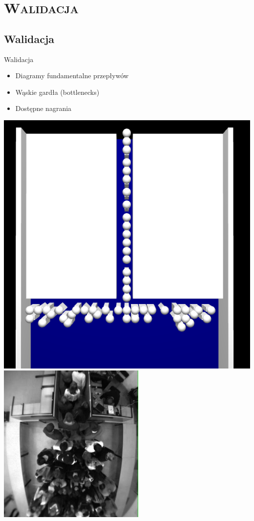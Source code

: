 \section{\scshape Walidacja}

\subsection{Walidacja}
\begin{frame}{Walidacja}
\begin{itemize}
\item Diagramy fundamentalne przepływów
\item Wąskie gardła (bottlenecks)
\item Dostępne nagrania
\end{itemize}
\begin{center}
\includegraphics[scale=0.3]{obrazek-bottleneck}
\includegraphics[scale=0.43]{obrazek-bottleneck-real}
\end{center}
\end{frame}

